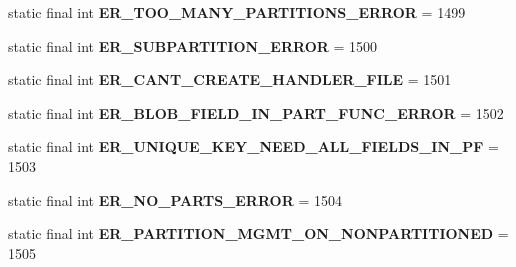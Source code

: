 \begin{DoxyCompactItemize}
static final int {\bfseries E\+R\+\_\+\+T\+O\+O\+\_\+\+M\+A\+N\+Y\+\_\+\+P\+A\+R\+T\+I\+T\+I\+O\+N\+S\+\_\+\+E\+R\+R\+OR} = 1499
\item 
\mbox{\label{classcom_1_1mysql_1_1jdbc_1_1_mysql_error_numbers_a03141ba55927ab42e8d1e03c15aed49b}} 
static final int {\bfseries E\+R\+\_\+\+S\+U\+B\+P\+A\+R\+T\+I\+T\+I\+O\+N\+\_\+\+E\+R\+R\+OR} = 1500
\item 
\mbox{\label{classcom_1_1mysql_1_1jdbc_1_1_mysql_error_numbers_a2574b4cb174cc2e0a2b95523fdcda874}} 
static final int {\bfseries E\+R\+\_\+\+C\+A\+N\+T\+\_\+\+C\+R\+E\+A\+T\+E\+\_\+\+H\+A\+N\+D\+L\+E\+R\+\_\+\+F\+I\+LE} = 1501
\item 
\mbox{\label{classcom_1_1mysql_1_1jdbc_1_1_mysql_error_numbers_ab195943373d304831eecd4330b87d888}} 
static final int {\bfseries E\+R\+\_\+\+B\+L\+O\+B\+\_\+\+F\+I\+E\+L\+D\+\_\+\+I\+N\+\_\+\+P\+A\+R\+T\+\_\+\+F\+U\+N\+C\+\_\+\+E\+R\+R\+OR} = 1502
\item 
\mbox{\label{classcom_1_1mysql_1_1jdbc_1_1_mysql_error_numbers_a47adc192db31f92ddbf30e3b6fd9c5d8}} 
static final int {\bfseries E\+R\+\_\+\+U\+N\+I\+Q\+U\+E\+\_\+\+K\+E\+Y\+\_\+\+N\+E\+E\+D\+\_\+\+A\+L\+L\+\_\+\+F\+I\+E\+L\+D\+S\+\_\+\+I\+N\+\_\+\+PF} = 1503
\item 
\mbox{\label{classcom_1_1mysql_1_1jdbc_1_1_mysql_error_numbers_afee5c7182334cdcc55c43edf68c0f588}} 
static final int {\bfseries E\+R\+\_\+\+N\+O\+\_\+\+P\+A\+R\+T\+S\+\_\+\+E\+R\+R\+OR} = 1504
\item 
\mbox{\label{classcom_1_1mysql_1_1jdbc_1_1_mysql_error_numbers_a954bb074060179138e26016e90a6f85e}} 
static final int {\bfseries E\+R\+\_\+\+P\+A\+R\+T\+I\+T\+I\+O\+N\+\_\+\+M\+G\+M\+T\+\_\+\+O\+N\+\_\+\+N\+O\+N\+P\+A\+R\+T\+I\+T\+I\+O\+N\+ED} = 1505
\item 
\mbox{\label{classcom_1_1mysql_1_1jdbc_1_1_mysql_error_numbers_afa20519c81d33bbc7a0a67ff30b0e72f}} 

\end{DoxyCompactItemize}
